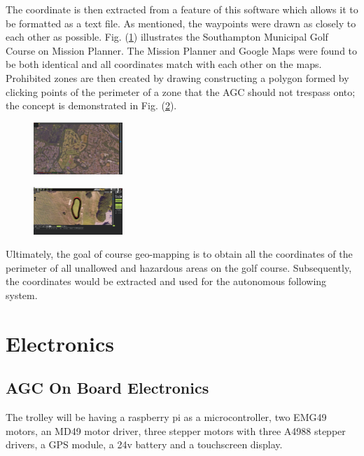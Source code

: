 \documentclass[11pt,landscape]{article}
\begin{document}
\begin{multicols}{3}
The coordinate is then extracted from a feature of this software which allows it
to be formatted as a text file. As mentioned, the waypoints were drawn as
closely to each other as possible. Fig. (\ref{fig:mission_planner}) illustrates
the Southampton Municipal Golf Course on Mission Planner. The Mission Planner
and Google Maps were found to be both identical and all coordinates match with
each other on the maps. Prohibited zones are then created by drawing constructing
a polygon formed by clicking points of the perimeter of a zone that the AGC should
not trespass onto; the concept is demonstrated in Fig. (\ref{fig:polygon1}).

\begin{figure}[H]
    \begin{center}
        \includegraphics[width=0.3\textwidth]{Municipal.png}
    \end{center}
    \label{fig:mission_planner}
\end{figure}

\begin{figure}[H]
    \begin{center}
        \includegraphics[width=0.3\textwidth]{polygon 1.png}
    \end{center}
    \label{fig:polygon1}
\end{figure}

Ultimately, the goal of course geo-mapping is to obtain all the coordinates of the
perimeter of all unallowed and hazardous areas on the golf course. Subsequently, the
coordinates would be extracted and used for the autonomous following system.

\section{Electronics}
\label{electronics}
\subsection{AGC On Board Electronics}
The trolley will be having a raspberry pi as a microcontroller, two EMG49
motors, an MD49 motor driver, three stepper motors with three A4988 stepper
drivers, a GPS module, a 24v battery and a touchscreen display.


\end{multicols}
\end{document}
